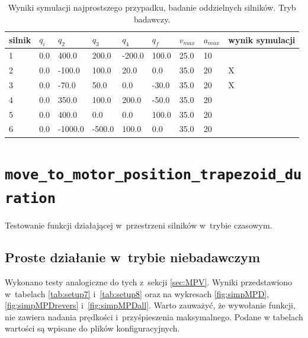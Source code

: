 \documentclass[a4paper, 12pt]{article}
\begin{document}
	\begin{table}[H]
	\centering
	\begin{tabular}{|m{2.5em}|m{3em}|m{3.5em}|m{3em}|m{3em}|m{3em}|m{4em}|m{3em}|m{5em}|}
	\hline
	silnik&$ q_i $ & $ q_2 $ & $ q_3 $ & $q_4$ & $ q_f $ & $ v_{max} $ & $ a_{max} $&wynik symulacji\\
	\hline
	\hline
	\hspace{1em}1& 0.0 & 400.0 & 200.0 & -200.0 & 100.0 & 25.0 & 10&\hspace{2em}\checkmark\\ %
	\hline
	\hspace{1em}2& 0.0 & -100.0 & 100.0 & 20.0 & 0.0 & 35.0 & 20&\hspace{2em}X\\ %
	\hline
	\hspace{1em}3& 0.0 & -70.0 & 50.0 & 0.0 & -30.0 & 35.0 & 20&\hspace{2em}X\\ %
	\hline
	\hspace{1em}4& 0.0 & 350.0 & 100.0 & 200.0 & -50.0 & 35.0 & 20&\hspace{2em}\checkmark\\  %
	\hline
	\hspace{1em}5& 0.0 & 400.0 & 0.0 & 0.0 & 100.0 & 35.0 & 20&\hspace{2em}\checkmark\\  %
	\hline
	\hspace{1em}6& 0.0 & -1000.0 & -500.0 & 100.0 & 0.0 & 35.0 & 20&\hspace{2em}\checkmark\\  %
	\hline
	\end{tabular}
	\caption{Wyniki symulacji najprostszego przypadku, badanie oddzielnych silników. Tryb badawczy.}
	\label{tab:setup6}
	\end{table}	
	
	\section{\texttt{move\_to\_motor\_position\_trapezoid\_duration}}
	Testowanie funkcji działającej w~przestrzeni silników w~trybie czasowym.
	\subsection{Proste działanie w~trybie niebadawczym}
	Wykonano testy analogiczne do tych z~sekcji \ref{sec:MPV}. Wyniki przedstawiono w~tabelach \ref{tab:setup7} i~\ref{tab:setup8} oraz  na wykresach \ref{fig:simpMPD}, \ref{fig:simpMPDrevers} i~\ref{fig:simpMPDall}. Warto zauważyć, że wywołanie funkcji, nie zawiera nadania prędkości i~przyśpieszenia maksymalnego. Podane w tabelach wartości są wpisane do plików konfiguracyjnych.
\end{document}
